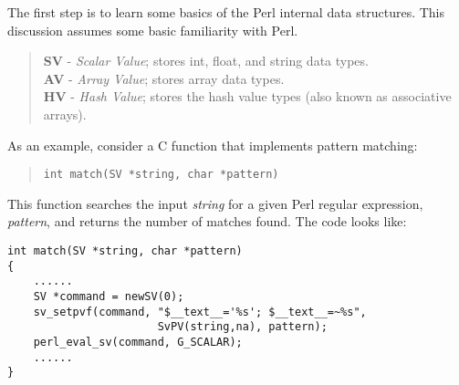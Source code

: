 \documentclass{article}
\begin{document}
The first step is to learn some basics of the Perl internal data
structures. This discussion assumes some basic familiarity with Perl.

\begin{quote}
{\bf SV} - {\em Scalar Value\/}; stores int, float, and string data types.\\
{\bf AV} - {\em Array Value\/}; stores array data types.\\
{\bf HV} - {\em Hash Value\/}; stores the hash value types (also known as
associative arrays).
\end{quote}

As an example, consider a C function that implements pattern matching:

\begin{quote}
    {\tt  int match(SV *string, char *pattern) }
\end{quote}

This function searches the input {\em string\/} for a given Perl regular
expression, {\em pattern\/}, and returns the number of matches found.  The
code looks like:



\begin{verbatim}
int match(SV *string, char *pattern)
{
    ......
    SV *command = newSV(0);
    sv_setpvf(command, "$__text__='%s'; $__text__=~%s",
                       SvPV(string,na), pattern);
    perl_eval_sv(command, G_SCALAR);
    ......
}
\end{verbatim}
\end{document}
